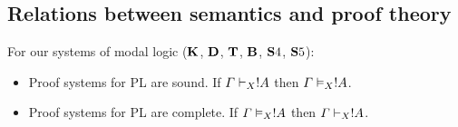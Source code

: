 \documentclass[../../../include/open-logic-section]{subfiles}
\begin{document}
\subsection{Relations between semantics and proof theory}

For our systems of modal logic ($\Log K$, $\Log D$, $\Log T$, $\Log B$, $\Log S4$, $\Log S5$):

\begin{itemize}
	\item Proof systems for PL are sound. If $\Gamma \Proves[X] !A$ then $\Gamma \Entails[X] !A$.
	\item Proof systems for PL are complete. If $\Gamma \Entails[X] !A$ then $\Gamma \Proves[X] !A$.
\end{itemize}
\end{document}
